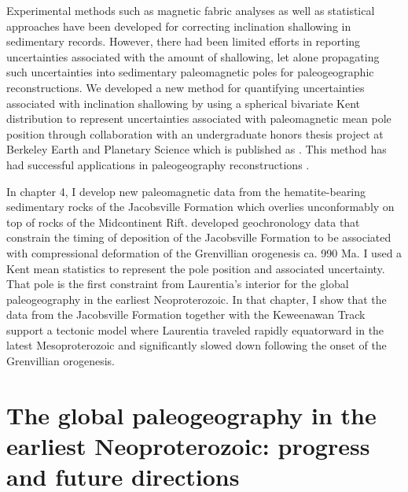Experimental methods such as magnetic fabric analyses \cite[e.g.][]{Kodama1995a, Bilardello2010a, Bilardello2010c, Bilardello2010b} as well as statistical approaches \cite[e.g.][]{Tauxe2004b} have been developed for correcting inclination shallowing in sedimentary records. However, there had been limited efforts in reporting uncertainties associated with the amount of shallowing, let alone propagating such uncertainties into sedimentary paleomagnetic poles for paleogeographic reconstructions. We developed a new method for quantifying uncertainties associated with inclination shallowing by using a spherical bivariate Kent distribution to represent uncertainties associated with paleomagnetic mean pole position through collaboration with an undergraduate honors thesis project at Berkeley Earth and Planetary Science which is published as \cite{Pierce2022a}. This method has had successful applications in paleogeography reconstructions \citep{Slotznick2023a, Vaes2023a, Zhang2024a}. 

In chapter 4, I develop new paleomagnetic data from the hematite-bearing sedimentary rocks of the Jacobsville Formation which overlies unconformably on top of rocks of the Midcontinent Rift. \cite{Hodgin2022a} developed geochronology data that constrain the timing of deposition of the Jacobsville Formation to be associated with compressional deformation of the Grenvillian orogenesis ca. 990 Ma. I used a Kent mean statistics to represent the pole position and associated uncertainty. That pole is the first constraint from Laurentia's interior for the global paleogeography in the earliest Neoproterozoic. In that chapter, I show that the data from the Jacobsville Formation together with the Keweenawan Track support a tectonic model where Laurentia traveled rapidly equatorward in the latest Mesoproterozoic and significantly slowed down following the onset of the Grenvillian orogenesis. 

\section{The global paleogeography in the earliest Neoproterozoic: progress and future directions}

